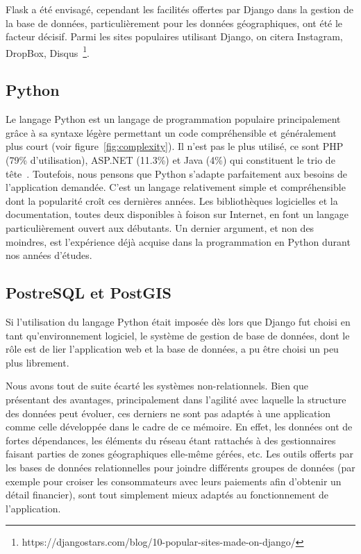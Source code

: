 \documentclass{EPL-master-thesis-covers-FR}
\begin{document}
					Flask a été envisagé, cependant les facilités offertes par Django dans la gestion de la base de données, particulièrement pour les données géographiques, ont été le facteur décisif. Parmi les sites populaires utilisant Django, on citera Instagram, DropBox, Disqus~\footnote{https://djangostars.com/blog/10-popular-sites-made-on-django/}.

			\subsection*{Python}
				Le langage Python est un langage de programmation populaire principalement grâce à sa syntaxe légère permettant un code compréhensible et généralement plus court (voir figure~\ref{fig:complexity}). Il n'est pas le plus utilisé, ce sont PHP (79\% d'utilisation), ASP.NET (11.3\%) et Java (4\%) qui constituent le trio de tête~\cite{ref:popular_programming_languages}. Toutefois, nous pensons que Python s'adapte parfaitement aux besoins de l'application demandée. C'est un langage relativement simple et compréhensible dont la popularité croît ces dernières années. Les bibliothèques logicielles et la documentation, toutes deux disponibles à foison sur Internet, en font un langage particulièrement ouvert aux débutants. Un dernier argument, et non des moindres, est l'expérience déjà acquise dans la programmation en Python durant nos années d'études.

			\subsection*{PostreSQL et PostGIS}

				Si l'utilisation du langage Python était imposée dès lors que Django fut choisi en tant qu'environnement logiciel, le système de gestion de base de données, dont le rôle est de lier l'application web et la base de données, a pu être choisi un peu plus librement.

				Nous avons tout de suite écarté les systèmes non-relationnels. Bien que présentant des avantages, principalement dans l'agilité avec laquelle la structure des données peut évoluer, ces derniers ne sont pas adaptés à une application comme celle développée dans le cadre de ce mémoire. En effet, les données ont de fortes dépendances, les éléments du réseau étant rattachés à des gestionnaires faisant parties de zones géographiques elle-même gérées, etc. Les outils offerts par les bases de données relationnelles pour joindre différents groupes de données (par exemple pour croiser les consommateurs avec leurs paiements afin d'obtenir un détail financier), sont tout simplement mieux adaptés au fonctionnement de l'application.
\end{document}

